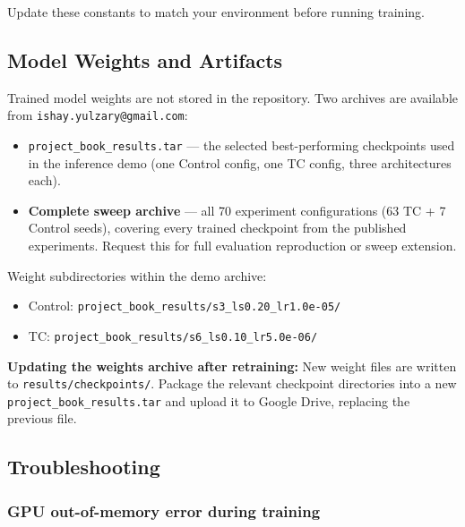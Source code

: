 \documentclass[12pt,a4paper]{article}
\begin{document}
Update these constants to match your environment before running training.

\subsection{Model Weights and Artifacts}
\label{sec:mg-weights}

Trained model weights are not stored in the repository. Two archives are
available from \texttt{ishay.yulzary@gmail.com}:

\begin{itemize}
    \item \texttt{project\_book\_results.tar} --- the selected best-performing
          checkpoints used in the inference demo (one Control config, one TC
          config, three architectures each).
    \item \textbf{Complete sweep archive} --- all 70 experiment configurations
          (63 TC + 7 Control seeds), covering every trained checkpoint from
          the published experiments. Request this for full evaluation
          reproduction or sweep extension.
\end{itemize}

Weight subdirectories within the demo archive:
\begin{itemize}
    \item Control: \texttt{project\_book\_results/s3\_ls0.20\_lr1.0e-05/}
    \item TC: \texttt{project\_book\_results/s6\_ls0.10\_lr5.0e-06/}
\end{itemize}

\textbf{Updating the weights archive after retraining:}
New weight files are written to \texttt{results/checkpoints/}. Package the
relevant checkpoint directories into a new
\\\texttt{project\_book\_results.tar} and upload it to Google Drive, replacing
the previous file.


\subsection{Troubleshooting}
\label{sec:mg-troubleshoot}

\subsubsection{GPU out-of-memory error during training}
\label{sec:mg-troubleshoot-oom}
\end{document}

